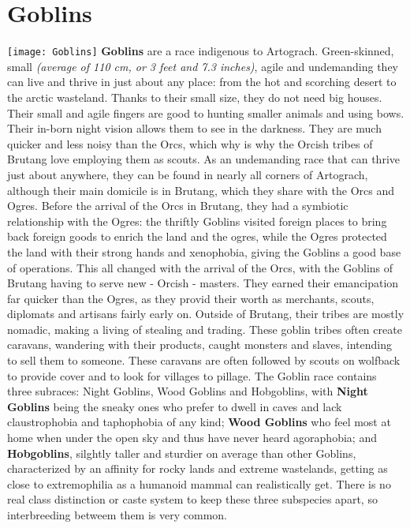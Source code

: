 \documentclass[openany,10pt,a4paper]{book}
\begin{document}
\section{Goblins}
\texttt{[image: Goblins]}\newline
\textbf{Goblins} are a race indigenous to Artograch. Green-skinned, small \textit{(average of 110 cm, or 3 feet and 7.3 inches)}, agile and undemanding  they can live and thrive in just about any place: from the hot and scorching desert to the arctic wasteland. Thanks to their small size, they do not need big houses. Their small and agile fingers are good to hunting smaller animals and using bows. Their in-born night vision allows them to see in the darkness. They are much quicker and less noisy than the Orcs, which why is why the Orcish tribes of Brutang love employing them as scouts.\newline
As an undemanding race that can thrive just about anywhere, they can be found in nearly all corners of Artograch, although their main domicile is in Brutang, which they share with the Orcs and Ogres. Before the arrival of the Orcs in Brutang, they had a symbiotic relationship with the Ogres: the thriftly Goblins visited foreign places to bring back foreign goods to enrich the land and the ogres, while the Ogres protected the land with their strong hands and xenophobia, giving the Goblins a good base of operations. This all changed with the arrival of the Orcs, with the Goblins of Brutang having to serve new - Orcish - masters. They earned their emancipation far quicker than the Ogres, as they provid their worth as merchants, scouts, diplomats and artisans fairly early on. Outside of Brutang, their tribes are mostly nomadic, making a living of stealing and trading. These goblin tribes often create caravans, wandering with their products, caught monsters and slaves, intending to sell them to someone. These caravans are often followed by scouts on wolfback to provide cover and to look for villages to pillage.\newline
The Goblin race contains three subraces: Night Goblins, Wood Goblins and Hobgoblins, with \textbf{Night Goblins} being the sneaky ones who prefer to dwell in caves and lack claustrophobia and taphophobia of any kind; \textbf{Wood Goblins} who feel most at home when under the open sky and thus have never heard agoraphobia; and \textbf{Hobgoblins}, silghtly taller and sturdier on average than other Goblins, characterized by an affinity for rocky lands and extreme wastelands, getting as close to extremophilia as a humanoid mammal can realistically get. There is no real class distinction or caste system to keep these three subspecies apart, so interbreeding betweem them is very common.\newline
\end{document}
